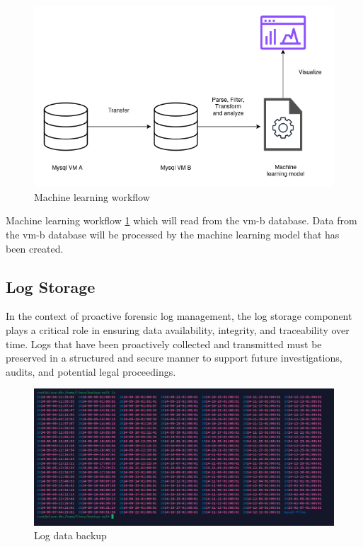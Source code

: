 \begin{figure}[H] 
	\centering
	\includegraphics[width=14cm]{figure/ml-workflow.png}
	\caption{Machine learning workflow}
	\label{fig:mlops}
\end{figure}

Machine learning workflow \ref{fig:mlops} which will read from the vm-b database. Data from the vm-b database will be processed by the machine learning model that has been created.

\subsection{Log Storage}
In the context of proactive forensic log management, the log storage component plays a critical role in ensuring data availability, integrity, and traceability over time. Logs that have been proactively collected and transmitted must be preserved in a structured and secure manner to support future investigations, audits, and potential legal proceedings.

\begin{figure}[H] 
	\centering
	\includegraphics[width=14cm]{figure/log-backup-sql.png}
	\caption{Log data backup}
	\label{fig:logs-backup-linux}
\end{figure}


